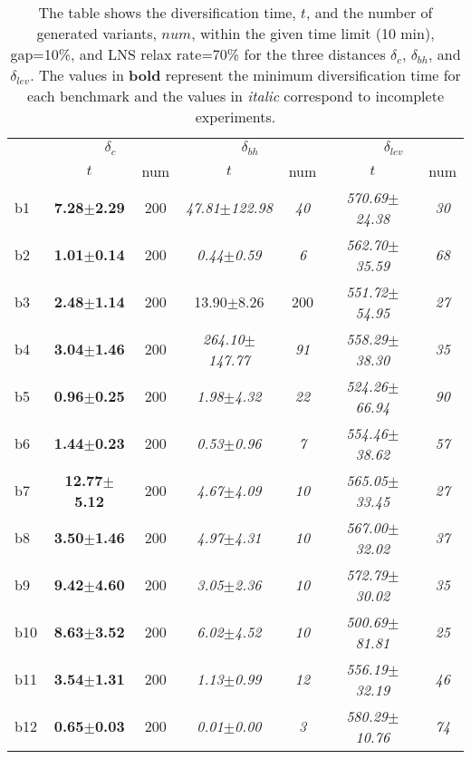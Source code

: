 \begin{longtable}{|l|c|c|c|c|c|c|}
\caption{\label{tab:distances}{The table shows 
		      the diversification time, $t$, and the number of generated
		      variants, $num$, within the given time limit (10 min), gap=10\%,
		      and \ac{LNS} relax rate=70\%
		      for the three distances $\delta_c$, $\delta_{bh}$,
		      and $\delta_{lev}$.
		      The values in  \textbf{bold} represent the minimum 
		      diversification time for each benchmark and the values in \emph{italic} 
		      correspond to incomplete experiments.}}\\
\hline
&\multicolumn{2}{c|}{$\delta_c$}&\multicolumn{2}{c|}{$\delta_{bh}$}&\multicolumn{2}{c|}{$\delta_{lev}$}\\
\cline{2-7}
&$t$&num&$t$&num&$t$&num\\
\hline
b1&\textbf{7.28$\pm$2.29} & 200 &\textit{47.81$\pm$122.98} & \textit{40 }&\textit{570.69$\pm$24.38} & \textit{30 }
\\
b2&\textbf{1.01$\pm$0.14} & 200 &\textit{0.44$\pm$0.59} & \textit{6 }&\textit{562.70$\pm$35.59} & \textit{68 }
\\
b3&\textbf{2.48$\pm$1.14} & 200 &13.90$\pm$8.26 & 200 &\textit{551.72$\pm$54.95} & \textit{27 }
\\
b4&\textbf{3.04$\pm$1.46} & 200 &\textit{264.10$\pm$147.77} & \textit{91 }&\textit{558.29$\pm$38.30} & \textit{35 }
\\
b5&\textbf{0.96$\pm$0.25} & 200 &\textit{1.98$\pm$4.32} & \textit{22 }&\textit{524.26$\pm$66.94} & \textit{90 }
\\
b6&\textbf{1.44$\pm$0.23} & 200 &\textit{0.53$\pm$0.96} & \textit{7 }&\textit{554.46$\pm$38.62} & \textit{57 }
\\
b7&\textbf{12.77$\pm$5.12} & 200 &\textit{4.67$\pm$4.09} & \textit{10 }&\textit{565.05$\pm$33.45} & \textit{27 }
\\
b8&\textbf{3.50$\pm$1.46} & 200 &\textit{4.97$\pm$4.31} & \textit{10 }&\textit{567.00$\pm$32.02} & \textit{37 }
\\
b9&\textbf{9.42$\pm$4.60} & 200 &\textit{3.05$\pm$2.36} & \textit{10 }&\textit{572.79$\pm$30.02} & \textit{35 }
\\
b10&\textbf{8.63$\pm$3.52} & 200 &\textit{6.02$\pm$4.52} & \textit{10 }&\textit{500.69$\pm$81.81} & \textit{25 }
\\
b11&\textbf{3.54$\pm$1.31} & 200 &\textit{1.13$\pm$0.99} & \textit{12 }&\textit{556.19$\pm$32.19} & \textit{46 }
\\
b12&\textbf{0.65$\pm$0.03} & 200 &\textit{0.01$\pm$0.00} & \textit{3 }&\textit{580.29$\pm$10.76} & \textit{74 }

\end{longtable}
